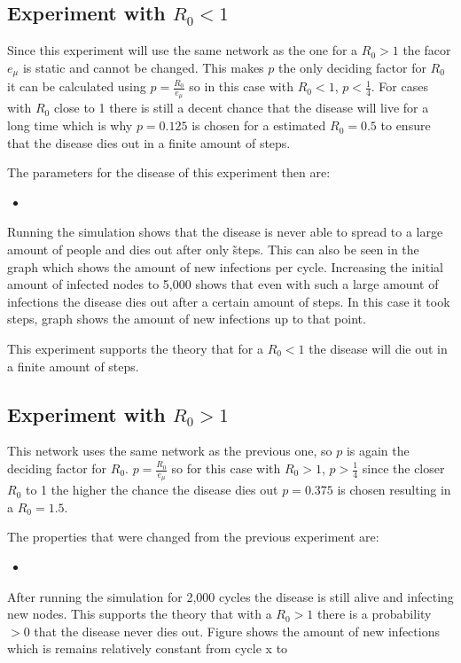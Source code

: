 \subsection{Experiment with $R_0 < 1$}
Since this experiment will use the same network as the one for a $R_0 > 1$ the
facor $e_\mu$ is static and cannot be changed. This makes $p$ the only deciding
factor for $R_0$ it can be calculated using $p = \frac{R_0}{e_\mu}$ so in this case
with $R_0 < 1$, $p < \frac{1}{4}$. For cases with $R_0$ close to 1 there is still
a decent chance that the disease will live for a long time which is why $p=0.125$
is chosen for a estimated $R_0=0.5$ to ensure that the disease dies out in a finite
amount of steps.

The parameters for the disease of this experiment then are:
\begin{itemize}
    \item %
\end{itemize}

Running the simulation shows that the disease is never able to spread to a large
amount of people and dies out after only \~ %
steps. This can also be seen in the graph %
which shows the amount of new infections per cycle. 
Increasing the initial amount of infected nodes to 5,000 shows that even with
such a large amount of infections the disease dies out after a certain amount of steps.
In this case it took %
steps, graph %
shows the amount of new infections up to that point.

This experiment supports the theory that for a $R_0 < 1$ the disease will die out
in a finite amount of steps.

\subsection{Experiment with $R_0 > 1$}
This network uses the same network as the previous one, so $p$ is again the deciding
factor for $R_0$. $p = \frac{R_0}{e_\mu}$ so for this case with $R_0 > 1$, $p > \frac{1}{4}$
since the closer $R_0$ to 1 the higher the chance the disease dies out $p=0.375$ is chosen
resulting in a $R_0 = 1.5$.

The properties that were changed from the previous experiment are:
\begin{itemize}
    \item %
\end{itemize}

After running the simulation for 2,000 cycles the disease is still alive and infecting
new nodes. This supports the theory that with a $R_0 > 1$ there is a probability $> 0$
that the disease never dies out. Figure %
shows the amount of new infections which is remains relatively constant 
from cycle x to %

